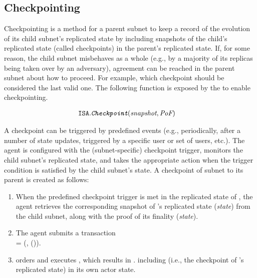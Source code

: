 
\subsection{Checkpointing} 
Checkpointing is a method for a parent subnet to keep a record of the evolution of its child subnet's replicated state
by including snapshots of the child's replicated state (called checkpoints) in the parent's replicated state.
If, for some reason, the child subnet misbehaves as a whole (e.g., by a majority of its replicas being taken over by an adversary), 
agreement can be reached in the parent subnet about how to proceed.
For example, which checkpoint should be considered the last valid one.
The following function is exposed by the \sa to enable checkpointing.

\begin{align*}
    \texttt{ISA}.&\textit{\texttt{Checkpoint}}(\textit{snapshot}, \textit{PoF})
\end{align*}

A checkpoint can be triggered by predefined events (e.g.,  periodically, after a number of state updates, triggered by a specific user or set of users, etc.).
The \ipc agent is configured with the (subnet-specific) checkpoint trigger, monitors the child subnet's replicated state,
and takes the appropriate action when the trigger condition is satisfied by the child subnet's state.
A checkpoint of subnet  to its parent  is created as follows:
\begin{enumerate}

    \item When the predefined checkpoint trigger is met in the replicated state of ,
    the \ipc agent retrieves the corresponding snapshot of 's replicated state (\emph{state}) from the child subnet, along with the proof of its finality {\pof}(\emph{state}).

    \item The \ipc agent submits a transaction\\
     = (, {\pof}()).

    \item {} orders and executes , which results in . including 
    (i.e., the checkpoint of 's replicated state) in its own actor state.

\end{enumerate}

